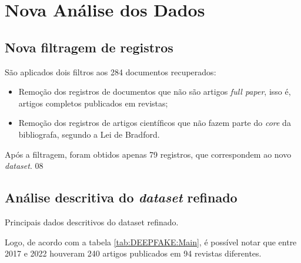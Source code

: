 \section{Nova Análise dos Dados}

\subsection{Nova filtragem de registros}

São aplicados dois filtros aos 284 documentos recuperados:
\begin{itemize}
    \item Remoção dos registros de documentos que não são artigos \textit{full paper}, isso é, artigos completos publicados em revistas;
    \item Remoção dos registros de artigos científicos que não fazem parte do \textit{core} da bibliografa, segundo a Lei de Bradford.
\end{itemize}

Após a filtragem, foram obtidos apenas 79 registros, que correspondem ao novo \textit{dataset}.
08
\subsection{Análise descritiva do \textit{dataset} refinado}

\begin{table}[]
    \centering
{}
    \caption{Principais dados descritivos do dataset refinado.}
    \label{tab:DEEPFAKE:Main}
\end{table}

Logo, de acordo com a tabela \ref{tab:DEEPFAKE:Main}, é possível notar que entre 2017 e 2022 houveram 240 artigos publicados em 94 revistas diferentes.